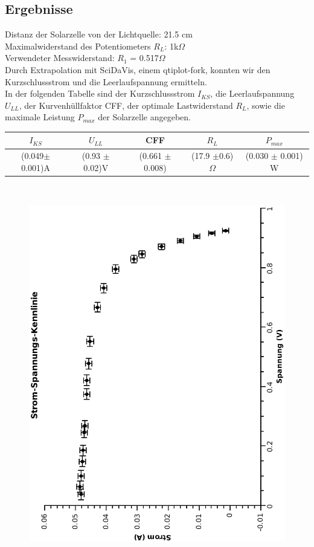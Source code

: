 \documentclass{article}
\begin{document}
\subsection{Ergebnisse}
Distanz der Solarzelle von der Lichtquelle: 21.5 cm\\
Maximalwiderstand des Potentiometers $R_L$: 1k$\Omega$ \\
Verwendeter Messwiderstand: $R_1$ = 0.517$\Omega$\\
Durch Extrapolation mit SciDaVis, einem qtiplot-fork, konnten wir den Kurzschlussstrom und die Leerlaufspannung ermitteln. \\
In der folgenden Tabelle sind der Kurzschlussstrom $I_{KS}$, die Leerlaufspannung $U_{LL}$, der Kurvenhüllfaktor CFF, der optimale Lastwiderstand $R_L$, sowie die maximale Leistung $P_{max}$ der Solarzelle angegeben.\\
\begin{center}
\begin{tabular}{|c|c|c|c|c|}
\hline 
$I_{KS}$ & $U_{LL}$ & CFF & $R_L$ & $P_{max}$ \\
\hline \hline
(0.049$\pm $0.001)A & (0.93 $\pm$ 0.02)V & (0.661 $\pm$ 0.008) & (17.9 $\pm $0.6) $\Omega$ &(0.030 $\pm$ 0.001) W \\
\hline
\end{tabular}\\
\end{center}
\begin{center}
\begin{figure}
\includegraphics[scale=0.7,angle=-90]{stromspannungsolar.eps}
\end{figure}
\end{center}
\end{document}
